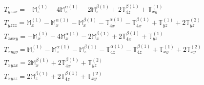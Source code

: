 \documentclass[fleqn,8pt,landscape]{jsarticle}
\begin{document}
\begin{align*}
& T_{yzzx} = - \mathbb{M}_{z}^{(1)} - 4 \mathbb{M}_{z}^{\alpha(1)} - 2 \mathbb{M}_{z}^{\beta(1)} + 2 \mathbb{T}_{4z}^{\beta(1)} + \mathbb{T}_{xy}^{(1)} \\
& T_{yzzz} = \mathbb{M}_{x}^{(1)} - \mathbb{M}_{x}^{\alpha(1)} - \mathbb{M}_{x}^{\beta(1)} - \mathbb{T}_{4x}^{\alpha(1)} - \mathbb{T}_{4x}^{\beta(1)} + \mathbb{T}_{yz}^{(1)} + 2 \mathbb{T}_{yz}^{(2)} \\
& T_{zxxy} = - \mathbb{M}_{x}^{(1)} - 4 \mathbb{M}_{x}^{\alpha(1)} - 2 \mathbb{M}_{x}^{\beta(1)} + 2 \mathbb{T}_{4x}^{\beta(1)} + \mathbb{T}_{yz}^{(1)} \\
& T_{xyyy} = \mathbb{M}_{z}^{(1)} - \mathbb{M}_{z}^{\alpha(1)} - \mathbb{M}_{z}^{\beta(1)} - \mathbb{T}_{4z}^{\alpha(1)} - \mathbb{T}_{4z}^{\beta(1)} + \mathbb{T}_{xy}^{(1)} + 2 \mathbb{T}_{xy}^{(2)} \\
& T_{xyzx} = 2 \mathbb{M}_{x}^{\beta(1)} + 2 \mathbb{T}_{4x}^{\beta(1)} + \mathbb{T}_{yz}^{(2)} \\
& T_{xyzz} = 2 \mathbb{M}_{z}^{\beta(1)} + 2 \mathbb{T}_{4z}^{\beta(1)} + \mathbb{T}_{xy}^{(2)}
\end{align*}
\end{document}
